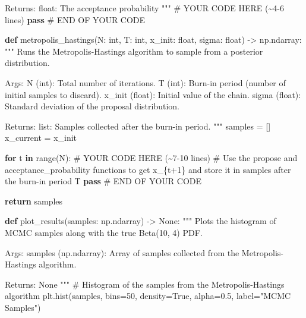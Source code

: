 \documentclass[
  letterpaper,
  DIV=11,
  numbers=noendperiod,
  oneside]{scrreprt}
\newenvironment{Shaded}{\begin{snugshade}}{\end{snugshade}}
\newcommand{\BuiltInTok}[1]{\textcolor[rgb]{0.00,0.23,0.31}{#1}}
\newcommand{\CommentTok}[1]{\textcolor[rgb]{0.37,0.37,0.37}{#1}}
\newcommand{\ControlFlowTok}[1]{\textcolor[rgb]{0.00,0.23,0.31}{\textbf{#1}}}
\newcommand{\DecValTok}[1]{\textcolor[rgb]{0.68,0.00,0.00}{#1}}
\newcommand{\FloatTok}[1]{\textcolor[rgb]{0.68,0.00,0.00}{#1}}
\newcommand{\KeywordTok}[1]{\textcolor[rgb]{0.00,0.23,0.31}{\textbf{#1}}}
\newcommand{\NormalTok}[1]{\textcolor[rgb]{0.00,0.23,0.31}{#1}}
\newcommand{\OperatorTok}[1]{\textcolor[rgb]{0.37,0.37,0.37}{#1}}
\newcommand{\RegionMarkerTok}[1]{\textcolor[rgb]{0.00,0.23,0.31}{#1}}
\newcommand{\StringTok}[1]{\textcolor[rgb]{0.13,0.47,0.30}{#1}}
\newcommand{\VariableTok}[1]{\textcolor[rgb]{0.07,0.07,0.07}{#1}}
\theoremstyle{remark}
\begin{document}
\begin{Shaded}
\begin{Highlighting}[]
\CommentTok{    Returns:}
\CommentTok{    float: The acceptance probability}
\CommentTok{    """}
    \CommentTok{\# YOUR CODE HERE (\textasciitilde{}4{-}6 lines)}
    \ControlFlowTok{pass}
    \CommentTok{\# }\RegionMarkerTok{END}\CommentTok{ OF YOUR CODE}


\KeywordTok{def}\NormalTok{ metropolis\_hastings(N: }\BuiltInTok{int}\NormalTok{, T: }\BuiltInTok{int}\NormalTok{, x\_init: }\BuiltInTok{float}\NormalTok{, sigma: }\BuiltInTok{float}\NormalTok{) }\OperatorTok{{-}\textgreater{}}\NormalTok{ np.ndarray:}
    \CommentTok{"""}
\CommentTok{    Runs the Metropolis{-}Hastings algorithm to sample from a posterior distribution.}

\CommentTok{    Args:}
\CommentTok{    N (int): Total number of iterations.}
\CommentTok{    T (int): Burn{-}in period (number of initial samples to discard).}
\CommentTok{    x\_init (float): Initial value of the chain.}
\CommentTok{    sigma (float): Standard deviation of the proposal distribution.}

\CommentTok{    Returns:}
\CommentTok{    list: Samples collected after the burn{-}in period.}
\CommentTok{    """}
\NormalTok{    samples }\OperatorTok{=}\NormalTok{ []}
\NormalTok{    x\_current }\OperatorTok{=}\NormalTok{ x\_init}

    \ControlFlowTok{for}\NormalTok{ t }\KeywordTok{in} \BuiltInTok{range}\NormalTok{(N):}
        \CommentTok{\# YOUR CODE HERE (\textasciitilde{}7{-}10 lines)}
        \CommentTok{\# Use the propose and acceptance\_probability functions to get x\_\{t+1\} and store it in samples after the burn{-}in period T}
        \ControlFlowTok{pass}
        \CommentTok{\# }\RegionMarkerTok{END}\CommentTok{ OF YOUR CODE}

    \ControlFlowTok{return}\NormalTok{ samples}


\KeywordTok{def}\NormalTok{ plot\_results(samples: np.ndarray) }\OperatorTok{{-}\textgreater{}} \VariableTok{None}\NormalTok{:}
    \CommentTok{"""}
\CommentTok{    Plots the histogram of MCMC samples along with the true Beta(10, 4) PDF.}

\CommentTok{    Args:}
\CommentTok{    samples (np.ndarray): Array of samples collected from the Metropolis{-}Hastings algorithm.}

\CommentTok{    Returns:}
\CommentTok{    None}
\CommentTok{    """}
    \CommentTok{\# Histogram of the samples from the Metropolis{-}Hastings algorithm}
\NormalTok{    plt.hist(samples, bins}\OperatorTok{=}\DecValTok{50}\NormalTok{, density}\OperatorTok{=}\VariableTok{True}\NormalTok{, alpha}\OperatorTok{=}\FloatTok{0.5}\NormalTok{, label}\OperatorTok{=}\StringTok{"MCMC Samples"}\NormalTok{)}


\end{Highlighting}
\end{Shaded}
\end{document}

